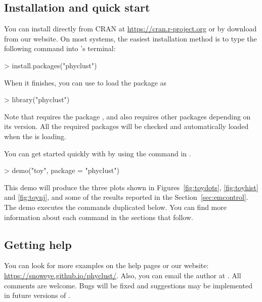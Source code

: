 \subsection[Installation and quick start]{Installation and quick start}
\label{sec:installation}

You can install  directly from CRAN at \url{https://cran.r-project.org} or
by download from our website.
On most systems, the easiest installation method is to type the following command
into 's terminal:
\begin{Code}
> install.packages("phyclust")
\end{Code}
When it finishes, you can use  to load the package as
\begin{Code}
> library("phyclust")
\end{Code}
Note that  requires the  package \citep{Paradis2004}, and
 also requires other packages depending on its version.
All the required packages will be checked and automatically loaded when
the  is loading.

You can get started quickly with  by using the  command
in .
\begin{Code}
> demo("toy", package = "phyclust")
\end{Code}
This demo will produce the three plots shown in Figures~\ref{fig:toydots},
\ref{fig:toyhist} and \ref{fig:toynj}, and some of the results reported in
the Section~\ref{sec:emcontrol}.
The demo executes the commands duplicated below.
You can find more information about each command in the sections that follow.



\subsection[Getting help]{Getting help}
\label{sec:needhelp}

You can look for more examples on the help pages or our
website:
\url{https://snoweye.github.io/phyclust/}.
Also, you can email the author at .
All comments are welcome.  Bugs will be fixed and
suggestions may be implemented in future versions of .

